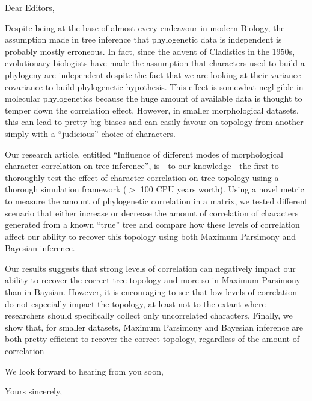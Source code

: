 \documentclass[11pt]{letter}
\begin{document}
\begin{letter}{}
\opening{Dear Editors,}

Despite being at the base of almost every endeavour in modern Biology, the assumption made in tree inference that phylogenetic data is independent is probably mostly erroneous.
In fact, since the advent of Cladistics in the 1950s, evolutionary biologists have made the assumption that characters used to build a phylogeny are independent despite the fact that we are looking at their variance-covariance to build phylogenetic hypothesis.
This effect is somewhat negligible in molecular phylogenetics because the huge amount of available data is thought to temper down the correlation effect.
However, in smaller morphological datasets, this can lead to pretty big biases and can easily favour on topology from another simply with a ``judicious'' choice of characters.

Our research article, entitled ``Influence of different modes of morphological character correlation on tree inference'', is - to our knowledge - the first to thoroughly test the effect of character correlation on tree topology using a thorough simulation framework ($>$ 100 CPU years worth).
Using a novel metric to measure the amount of phylogenetic correlation in a matrix, we tested different scenario that either increase or decrease the amount of correlation of characters generated from a known ``true'' tree and compare how these levels of correlation affect our ability to recover this topology using both Maximum Parsimony and Bayesian inference.

Our results suggests that strong levels of correlation can negatively impact our ability to recover the correct tree topology and more so in Maximum Parsimony than in Baysian.
However, it is encouraging to see that low levels of correlation do not especially impact the topology, at least not to the extant where researchers should specifically collect only uncorrelated characters.
Finally, we show that, for smaller datasets, Maximum Parsimony and Bayesian inference are both pretty efficient to recover the correct topology, regardless of the amount of correlation

We look forward to hearing from you soon,

\closing{Yours sincerely,}


\end{letter}
\end{document}
